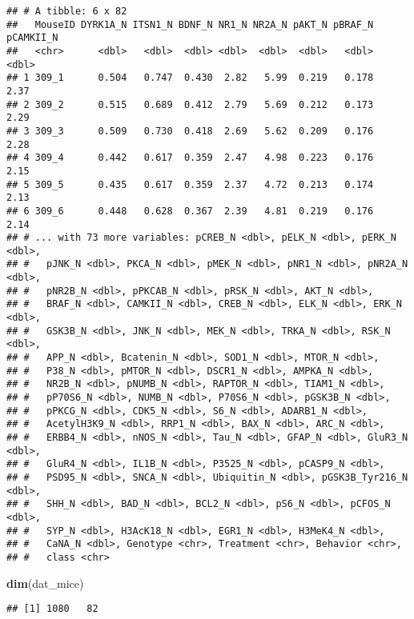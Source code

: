 \documentclass[]{article}
\newenvironment{Shaded}{\begin{snugshade}}{\end{snugshade}}
\newcommand{\KeywordTok}[1]{\textcolor[rgb]{0.13,0.29,0.53}{\textbf{#1}}}
\newcommand{\DataTypeTok}[1]{\textcolor[rgb]{0.13,0.29,0.53}{#1}}
\newcommand{\FloatTok}[1]{\textcolor[rgb]{0.00,0.00,0.81}{#1}}
\newcommand{\StringTok}[1]{\textcolor[rgb]{0.31,0.60,0.02}{#1}}
\newcommand{\OperatorTok}[1]{\textcolor[rgb]{0.81,0.36,0.00}{\textbf{#1}}}
\newcommand{\NormalTok}[1]{#1}
\begin{document}
\begin{verbatim}
## # A tibble: 6 x 82
##   MouseID DYRK1A_N ITSN1_N BDNF_N NR1_N NR2A_N pAKT_N pBRAF_N pCAMKII_N
##   <chr>      <dbl>   <dbl>  <dbl> <dbl>  <dbl>  <dbl>   <dbl>     <dbl>
## 1 309_1      0.504   0.747  0.430  2.82   5.99  0.219   0.178      2.37
## 2 309_2      0.515   0.689  0.412  2.79   5.69  0.212   0.173      2.29
## 3 309_3      0.509   0.730  0.418  2.69   5.62  0.209   0.176      2.28
## 4 309_4      0.442   0.617  0.359  2.47   4.98  0.223   0.176      2.15
## 5 309_5      0.435   0.617  0.359  2.37   4.72  0.213   0.174      2.13
## 6 309_6      0.448   0.628  0.367  2.39   4.81  0.219   0.176      2.14
## # ... with 73 more variables: pCREB_N <dbl>, pELK_N <dbl>, pERK_N <dbl>,
## #   pJNK_N <dbl>, PKCA_N <dbl>, pMEK_N <dbl>, pNR1_N <dbl>, pNR2A_N <dbl>,
## #   pNR2B_N <dbl>, pPKCAB_N <dbl>, pRSK_N <dbl>, AKT_N <dbl>,
## #   BRAF_N <dbl>, CAMKII_N <dbl>, CREB_N <dbl>, ELK_N <dbl>, ERK_N <dbl>,
## #   GSK3B_N <dbl>, JNK_N <dbl>, MEK_N <dbl>, TRKA_N <dbl>, RSK_N <dbl>,
## #   APP_N <dbl>, Bcatenin_N <dbl>, SOD1_N <dbl>, MTOR_N <dbl>,
## #   P38_N <dbl>, pMTOR_N <dbl>, DSCR1_N <dbl>, AMPKA_N <dbl>,
## #   NR2B_N <dbl>, pNUMB_N <dbl>, RAPTOR_N <dbl>, TIAM1_N <dbl>,
## #   pP70S6_N <dbl>, NUMB_N <dbl>, P70S6_N <dbl>, pGSK3B_N <dbl>,
## #   pPKCG_N <dbl>, CDK5_N <dbl>, S6_N <dbl>, ADARB1_N <dbl>,
## #   AcetylH3K9_N <dbl>, RRP1_N <dbl>, BAX_N <dbl>, ARC_N <dbl>,
## #   ERBB4_N <dbl>, nNOS_N <dbl>, Tau_N <dbl>, GFAP_N <dbl>, GluR3_N <dbl>,
## #   GluR4_N <dbl>, IL1B_N <dbl>, P3525_N <dbl>, pCASP9_N <dbl>,
## #   PSD95_N <dbl>, SNCA_N <dbl>, Ubiquitin_N <dbl>, pGSK3B_Tyr216_N <dbl>,
## #   SHH_N <dbl>, BAD_N <dbl>, BCL2_N <dbl>, pS6_N <dbl>, pCFOS_N <dbl>,
## #   SYP_N <dbl>, H3AcK18_N <dbl>, EGR1_N <dbl>, H3MeK4_N <dbl>,
## #   CaNA_N <dbl>, Genotype <chr>, Treatment <chr>, Behavior <chr>,
## #   class <chr>
\end{verbatim}

\begin{Shaded}
\begin{Highlighting}[]
\KeywordTok{dim}\NormalTok{(dat_mice)}
\end{Highlighting}
\end{Shaded}

\begin{verbatim}
## [1] 1080   82
\end{verbatim}

\begin{Shaded}
\end{Shaded}
\end{document}
